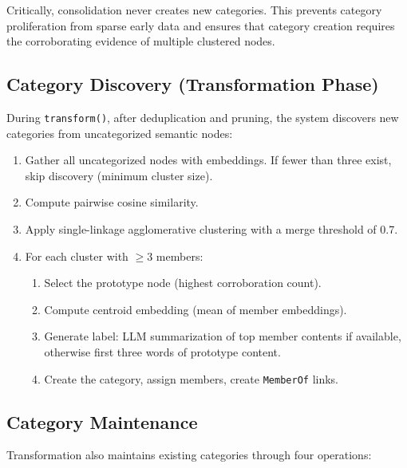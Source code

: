 Critically, consolidation never creates new categories. This prevents
category proliferation from sparse early data and ensures that category
creation requires the corroborating evidence of multiple clustered nodes.

\subsection{Category Discovery (Transformation Phase)}

During \texttt{transform()}, after deduplication and pruning, the system
discovers new categories from uncategorized semantic nodes:

\begin{enumerate}[nosep]
    \item Gather all uncategorized nodes with embeddings. If fewer than
    three exist, skip discovery (minimum cluster size).
    \item Compute pairwise cosine similarity.
    \item Apply single-linkage agglomerative clustering with a merge
    threshold of 0.7.
    \item For each cluster with $\geq$3 members:
    \begin{enumerate}[nosep]
        \item Select the prototype node (highest corroboration count).
        \item Compute centroid embedding (mean of member embeddings).
        \item Generate label: LLM summarization of top member contents if
        available, otherwise first three words of prototype content.
        \item Create the category, assign members, create \texttt{MemberOf}
        links.
    \end{enumerate}
\end{enumerate}

\subsection{Category Maintenance}

Transformation also maintains existing categories through four operations:

